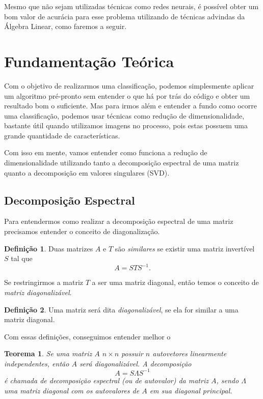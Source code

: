 \documentclass[a4paper, 12pt]{article}
\newtheorem{teorema}{Teorema}
\theoremstyle{definition}
\newtheorem{definicao}{Definição}
\theoremstyle{remark}
\begin{document}
Mesmo que não sejam utilizadas técnicas como redes neurais, é possível obter um bom valor de acurácia para esse problema utilizando de técnicas advindas da Álgebra Linear, como faremos a seguir.

\newpage
\section{Fundamentação Teórica}

Com o objetivo de realizarmos uma classificação, podemos simplesmente aplicar um algoritmo pré-pronto sem entender o que há por trás do código e obter um resultado bom o suficiente. Mas para irmos além e entender a fundo como ocorre uma classificação, podemos usar técnicas como redução de dimensionalidade, bastante útil quando utilizamos imagens no processo, pois estas possuem uma grande quantidade de características.

Com isso em mente, vamos entender como funciona a redução de dimensionalidade utilizando tanto a decomposição espectral de uma matriz quanto a decomposição em valores singulares (SVD).

\subsection{Decomposição Espectral}

Para entendermos como realizar a decomposição espectral de uma matriz precisamos entender o conceito de diagonalização.

\begin{definicao}
    Duas matrizes $A$ e $T$ são \textit{similares} se existir uma matriz invertível $S$ tal que $$A = STS^{-1}.$$
\end{definicao}

Se restringirmos a matriz $T$ a ser uma matriz diagonal, então temos o conceito de \textit{matriz diagonalizável}.

\begin{definicao}
    Uma matriz será dita \textit{diagonalizável}, se ela for similar a uma matriz diagonal.
\end{definicao}

Com essas definições, conseguimos entender melhor o

\begin{teorema}
    Se uma matriz $A$ $n \times n$ possuir $n$ autovetores linearmente independentes, então $A$ será diagonalizável. A decomposição $$A = S\Lambda S^{-1}$$ é chamada de decomposição espectral (ou de autovalor) da matriz $A$, sendo $\Lambda$ uma matriz diagonal com os autovalores de $A$ em sua diagonal principal.
\end{teorema}
\end{document}
